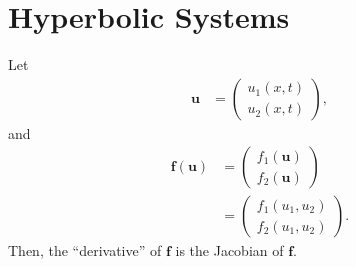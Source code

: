 \documentclass[10pt]{mypackage}
\begin{document}
\section{Hyperbolic Systems}%
Let
\begin{align*}
  \mathbf{u} &= \begin{pmatrix}u_1\left( x,t \right)\\u_2\left( x,t \right)\end{pmatrix},
\end{align*}
and
\begin{align*}
  \mathbf{f}\left( \mathbf{u} \right) &= \begin{pmatrix}f_1\left( \mathbf{u} \right)\\ f_2\left( \mathbf{u} \right)\end{pmatrix}\\
                                      &= \begin{pmatrix} f_1\left( u_1,u_2 \right)\\ f_2\left( u_1,u_2 \right)\end{pmatrix}.
\end{align*}
Then, the ``derivative'' of $\mathbf{f}$ is the Jacobian of $\mathbf{f}$.\newline
\end{document}
